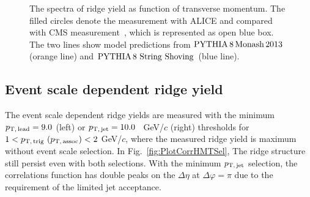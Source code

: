\begin{figure}[h!]
	\centering
	\caption{ The spectra of ridge yield as function of transverse momentum. The filled circles denote the measurement with ALICE and compared with CMS measurement~\cite{Khachatryan:2015lva}, which is represented as open blue box. The two lines show model predictions from $\mathrm{PYTHIA}\,8\,\mathrm{Monash}\,2013$ (orange line) and $\mathrm{PYTHIA}\,8~\mathrm{String}~\mathrm{Shoving}$ (blue line). }
	\label{fig:PlotYSpect}
\end{figure}

\subsection{Event scale dependent ridge yield}
The event scale dependent ridge yields are measured with the minimum $p_\mathrm{T,\,lead}=9.0$ (left) or $p_\mathrm{T,\,jet}=10.0$~ GeV/$c$ (right) thresholds for $1< p_\mathrm{T,\,trig}~\mathrm (p_\mathrm{T,\,assoc}) <2$ GeV/$c$, where the measured ridge yield is maximum without event scale selection. In Fig.~\ref{fig:PlotCorrHMTSel}, The ridge structure still persist even with both selections. With the minimum $p_\mathrm{T,\,jet}$ selection, the correlations function has double peaks on the $\Delta\eta$ at $\Delta\varphi = \pi$ due to the requirement of the limited jet acceptance.

